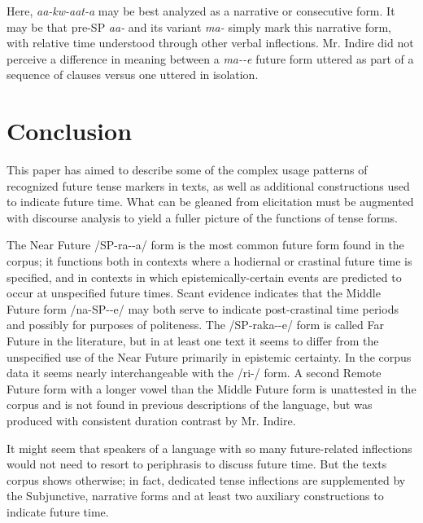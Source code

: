 \documentclass[output=paper]{langsci/langscibook}
\begin{document}
Here, \textit{aa-kw-aat-a} may be best analyzed as a narrative %
%
or consecutive form. It may be that pre-SP \textit{aa-} and its variant \textit{ma-} simply mark this narrative form, with relative time understood through other verbal inflections. {Mr. Indire} did not perceive a difference in meaning between a \textit{ma-{\longrule}-e} future form uttered as part of a sequence of clauses versus one uttered in isolation.

\section[Conclusion]{Conclusion} \label{sec:sarvasy:8}

This paper has aimed to describe some of the complex usage patterns of recognized future tense markers in  texts, as well as additional constructions used to indicate future time. What can be gleaned from elicitation must be augmented with discourse analysis to yield a fuller picture of the functions of tense forms. 

The Near Future /SP-ra-{\longrule}-a/ form is the most common future form found in the corpus; it functions both in contexts where a hodiernal or crastinal future time is specified, and in contexts in which epistemically-certain events are predicted to occur at unspecified future times. Scant evidence indicates that the Middle Future form /na-SP-{\longrule}-e/ may both serve to indicate post-crastinal time periods and possibly for purposes of politeness. The /SP-raka-{\longrule}-e/ form is called Far Future in the literature, but in at least one text it seems to differ from the unspecified use of the Near Future primarily in epistemic certainty. In the corpus data it seems nearly interchangeable with the /ri-/ form. A second Remote Future form with a longer vowel than the Middle Future form is unattested in the corpus and is not found in previous descriptions of the language, but was produced with consistent duration contrast by {Mr. Indire}. 

It might seem that speakers of a language with so many future-related inflections would not need to resort to periphrasis to discuss future time. But the  texts corpus shows otherwise; in fact, dedicated tense inflections are supplemented by the Subjunctive, narrative forms and at least two auxiliary constructions to indicate future time.
\end{document}
